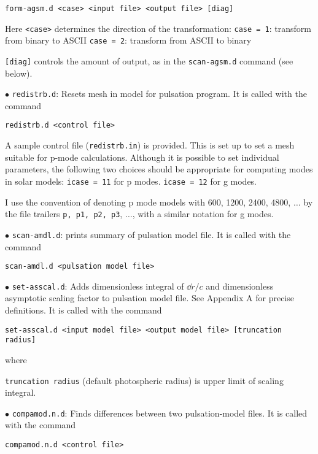 {\tt form-agsm.d <case> <input file> <output file> [diag]}

\item{}
Here {\tt <case>} determines the direction of the transformation:
\itemitem{--} {\tt case = 1}: transform from binary to ASCII
\itemitem{--} {\tt case = 2}: transform from ASCII to binary
\item{} {\tt [diag]} controls the amount of output, as in
the {\tt scan-agsm.d} command (see below).


\medskip
\item{$\bullet$}
{\tt redistrb.d}:
Resets mesh in model for pulsation program. It is called with the command

{\tt redistrb.d <control file>}

\item{}
A sample control file ({\tt redistrb.in}) is provided.
This is set up to set a mesh suitable for p-mode calculations.
Although it is possible to set individual parameters, the following
two choices should be appropriate for computing modes in solar models:
\itemitem{--}
{\tt icase = 11} for p modes.
\itemitem{--}
{\tt icase = 12} for g modes.
\smallskip
\item{}
I use the convention of denoting p mode models
with 600, 1200, 2400, 4800, $\ldots$ by the file trailers
{\tt p, p1, p2, p3}, $\ldots$, with a similar notation for g modes.

\medskip
\item{$\bullet$}
{\tt scan-amdl.d}: prints summary of pulsation model file.
It is called with the command

{\tt scan-amdl.d <pulsation model file>}

\medskip
\item{$\bullet$}
{\tt set-asscal.d}: Adds dimensionless integral of $\dd r/c$ and
dimensionless asymptotic scaling factor to pulsation model file.
See Appendix A for precise definitions.
It is called with the command

{\tt set-asscal.d <input model file> <output model file> [truncation radius]}

where

\itemitem{--} {\tt truncation radius} (default photospheric radius)
is upper limit of scaling integral.

\medskip
\item{$\bullet$}
{\tt compamod.n.d}:
Finds differences between two pulsation-model files.
It is called with the command

{\tt compamod.n.d <control file>}

